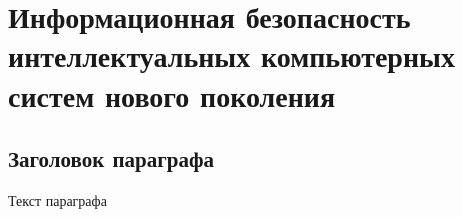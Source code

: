 \chapter{Информационная безопасность интеллектуальных компьютерных систем нового поколения}
\label{chapter_security}


\section{Заголовок параграфа}
Текст параграфа

%
